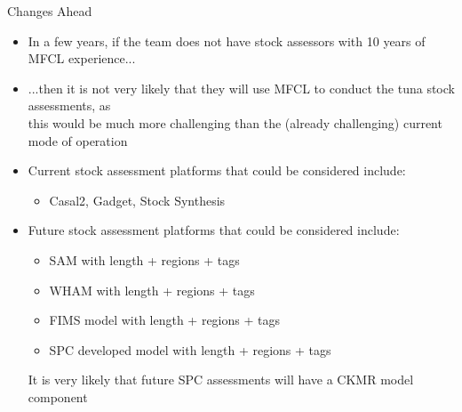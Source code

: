 \documentclass[aspectratio=169]{beamer}
\begin{document}
\begin{frame}{Changes Ahead}\fns
  \begin{itemize}
    \item[] In a few years, if the team does not have stock assessors with 10
    years of MFCL experience...\\[3ex]
    \item[] ...then it is not very likely that they will use MFCL to conduct the
    tuna stock assessments, as\\
    this would be much more challenging than the (already challenging) current
    mode of operation\\[3ex]
    \item[] Current stock assessment platforms that could be considered
    include:\\[0.5ex]
    \begin{itemize}\fns
      \item[] Casal2, Gadget, Stock Synthesis\\[2ex]
    \end{itemize}
    \item[] Future stock assessment platforms that could be considered
    include:\\[0.5ex]
    \begin{itemize}\fns
      \item[] SAM with length + regions + tags\\[1ex]
      \item[] WHAM with length + regions + tags\\[1ex]
      \item[] FIMS model with length + regions + tags\\[1ex]
      \item[] SPC developed model with length + regions + tags\\[3ex]
    \end{itemize}
    It is very likely that future SPC assessments will have a CKMR model
    component\\[3ex]
  \end{itemize}
\end{frame}

\end{document}
